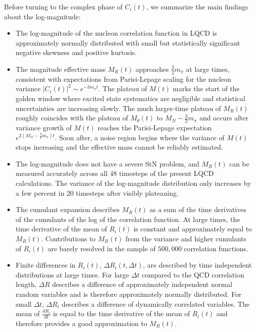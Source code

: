 Before turning to the complex phase of $C_i(t)$, we summarize the main findings about the log-magnitude:
%
\begin{itemize}
  \item 
  The log-magnitude of the nucleon correlation function in LQCD is approximately normally distributed with small 
  but statistically significant negative skewness and positive kurtosis.
  \item 
  The magnitude effective mass $M_R(t)$ approaches $\frac{3}{2}m_\pi$ at large times, consistent with expectations from Parisi-Lepage scaling for the nucleon variance $|C_i(t)|^2 \sim e^{-3 m_\pi t}$. 
  The plateau of $M(t)$ marks the start of the golden window where excited state systematics are negligible and 
  statistical uncertainties are increasing slowly. 
  The much larger-time plateau of $M_R(t)$ roughly coincides with the plateau of $M_\theta(t)$ to $M_N - \frac{3}{2}m_\pi$ and 
  occurs after variance growth of $M(t)$ reaches the Parisi-Lepage expectation $e^{2(M_N - \frac{3}{2}m_\pi)t}$. 
  Soon after, a noise region begins where the variance of $M(t)$ stops increasing and the effective mass cannot be reliably estimated.
  \item 
  The  log-magnitude does not have a severe StN problem, and $M_R(t)$ can be measured accurately across all 48 timesteps 
  of the present LQCD calculations.  
  The variance of the log-magnitude distribution only increases by a few percent in 20 timesteps after visibly plateauing.
  \item 
  The cumulant expansion describes $M_R(t)$ as a sum of the time derivatives of the cumulants of the log of the correlation function. 
  At large times, the time derivative of the mean of $R_i(t)$ is constant and approximately 
  equal to $M_R(t)$. Contributions to $M_R(t)$ from the variance and higher cumulants of $R_i(t)$ are barely 
  resolved in the sample of $500,000$ correlation functions. 
  \item 
  Finite differences in $R_i(t)$, $\Delta R_i(t, \Delta t)$, are described by time independent distributions at large times. 
  For large $\Delta t$ compared to the QCD correlation length, $\Delta R$ describes a difference of approximately 
  independent normal random variables and is therefore approximately normally distributed. 
  For small $\Delta t$, $\Delta R_i$ describes a difference of dynamically correlated variables. 
  The mean of $\frac{dR_i}{dt}$ is equal to the time derivative of the mean of $R_i(t)$ and therefore provides a good 
  approximation to $M_R(t)$. 

\end{itemize}
